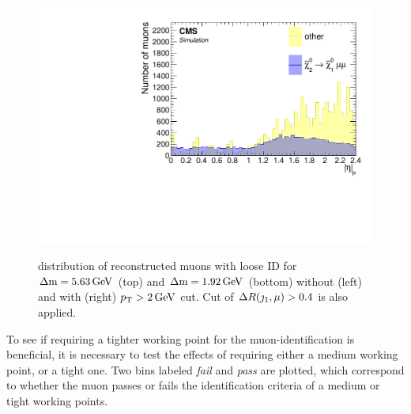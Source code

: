 \begin{figure}[!htb]
\includegraphics[width=0.48\linewidth]{plots/lepton_selection/lepton_selection_dm1p92/none_Muons_Eta_after_pt.pdf} \\
\caption[\abs{\eta} distribution of reconstructed muons with loose ID before and after $\pt>2\GeV$ cut]{ \abs{\eta} distribution of reconstructed muons with loose ID for $\Delta\mathrm{m}=5.63\,\text{Ge\hspace{-.08em}V}$ (top) and $\Delta\mathrm{m}=1.92\,\text{Ge\hspace{-.08em}V}$ (bottom) without (left) and with (right) $\pt>2\GeV$ cut. Cut of $\Delta R(\jmath_1,\mu)>0.4$ is also applied.}
\label{fig:muons-selection-eta}
\end{figure}

To see if requiring a tighter working point for the muon-identification is beneficial, it is necessary to test the effects of requiring either a medium working point, or a tight one. Two bins labeled \emph{fail} and \emph{pass} are plotted, which correspond to whether the muon passes or fails the identification criteria of a medium or tight working points.

